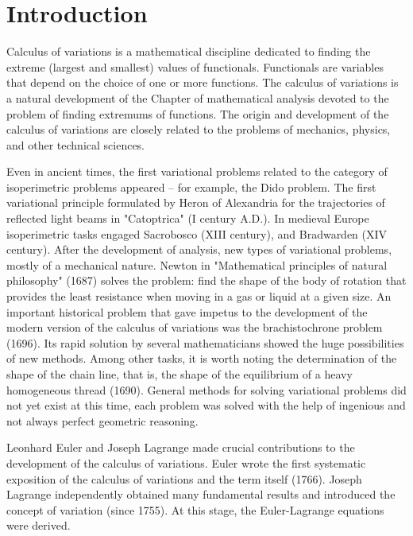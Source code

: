 
\section*{Introduction}

\begin{info}
    Calculus of variations is a mathematical discipline dedicated to finding the extreme (largest and smallest) values of functionals.
    Functionals are variables that depend on the choice of one or more functions.
    The calculus of variations is a natural development of the Chapter of mathematical analysis devoted to the problem of finding extremums of functions.
    The origin and development of the calculus of variations are closely related to the problems of mechanics, physics, and other technical sciences.
\end{info}

Even in ancient times, the first variational problems related to the category of isoperimetric problems appeared -- for example, the Dido problem. The first variational principle formulated by Heron of Alexandria for the trajectories of reflected light beams in "Catoptrica" (I century A.D.). In medieval Europe isoperimetric tasks engaged Sacrobosco (XIII century), and Bradwarden (XIV century). After the development of analysis, new types of variational problems, mostly of a mechanical nature. Newton in "Mathematical principles of natural philosophy" \; (1687) solves the problem: find the shape of the body of rotation that provides the least resistance when moving in a gas or liquid at a given size. An important historical problem that gave impetus to the development of the modern version of the calculus of variations was the brachistochrone problem (1696). Its rapid solution by several mathematicians showed the huge possibilities of new methods. Among other tasks, it is worth noting the determination of the shape of the chain line, that is, the shape of the equilibrium of a heavy homogeneous thread (1690). General methods for solving variational problems did not yet exist at this time, each problem was solved with the help of ingenious and not always perfect geometric reasoning.

Leonhard Euler and Joseph Lagrange made crucial contributions to the development of the calculus of variations. Euler wrote the first systematic exposition of the calculus of variations and the term itself (1766). Joseph Lagrange independently obtained many fundamental results and introduced the concept of variation (since 1755). At this stage, the Euler-Lagrange equations were derived.

